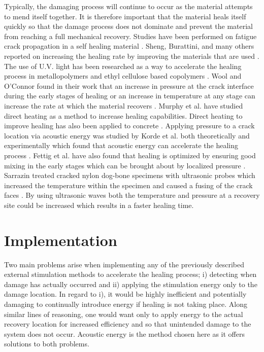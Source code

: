 Typically, the damaging process will continue to occur as the material attempts to mend itself together. It is therefore important that the material heals itself quickly so that the damage process does not dominate and prevent the material from reaching a full mechanical recovery. Studies have been performed on fatigue crack propagation in a self healing material \cite{Brown2003}. Sheng, Burattini, and many others reported on increasing the healing rate by improving the materials that are used \cite{Sheng2009, Burattini2009, Nakao2009, Imperiale2009, Zhang2007}. The use of U.V. light has been researched as a way to accelerate the healing process in metallopolymers and ethyl cellulose based copolymers \cite{Tang2009, Burnworth2009}. Wool and O'Connor found in their work that an increase in pressure at the crack interface during the early stages of healing or an increase in temperature at any stage can increase the rate at which the material recovers \cite{Wool1981}. Murphy et al. have studied direct heating as a method to increase healing capabilities\cite{Murphy2009}. Direct heating to improve healing has also been applied to concrete \cite{Garcia2009, Nishiwaki2009}. Applying pressure to a crack location via acoustic energy was studied by Korde et al. both theoretically and experimentally which found that acoustic energy can accelerate the healing process \cite{Sarrazin2009, Cushman2012, Barnes2009}. Fettig et al. have also found that healing is optimized by ensuring good mixing in the early stages which can be brought about by localized pressure \cite{Fettig2009}. Sarrazin treated cracked nylon dog-bone specimens with ultrasonic probes which increased the temperature within the specimen and caused a fusing of the crack faces  \cite{Sarrazin2-2009}. By using ultrasonic waves both the temperature and pressure at a recovery site could be increased which results in a faster healing time.

\section{Implementation}

Two main problems arise when implementing any of the previously described external stimulation methods to accelerate the healing process; i) detecting when damage has actually occurred and ii) applying the stimulation energy only to the damage location. In regard to i), it would be highly inefficient and potentially damaging to continually introduce energy if healing is not taking place. Along similar lines of reasoning, one would want only to apply energy to the actual recovery location for increased efficiency and so that unintended damage to the system does not occur. Acoustic energy is the method chosen here as it offers solutions to both problems. 

